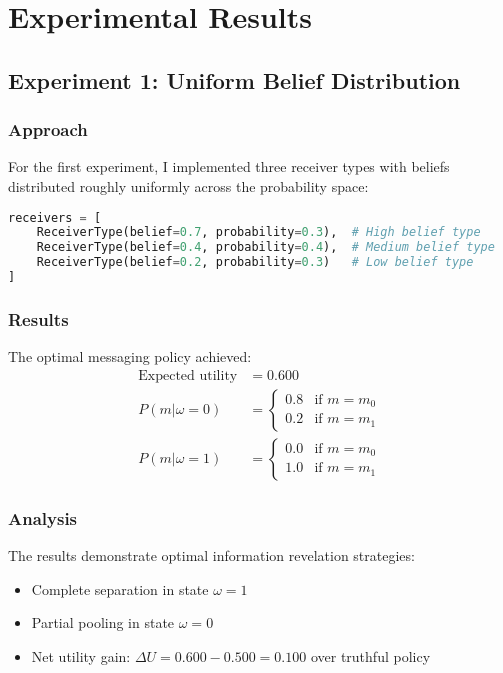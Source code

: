 \documentclass[12pt]{article}
\begin{document}
\section{Experimental Results}

\subsection{Experiment 1: Uniform Belief Distribution}

\subsubsection{Approach}
For the first experiment, I implemented three receiver types with beliefs distributed roughly uniformly across the probability space:

\begin{lstlisting}[language=Python, caption=Experiment 1 Setup]
receivers = [
    ReceiverType(belief=0.7, probability=0.3),  # High belief type
    ReceiverType(belief=0.4, probability=0.4),  # Medium belief type
    ReceiverType(belief=0.2, probability=0.3)   # Low belief type
]
\end{lstlisting}

\subsubsection{Results}
The optimal messaging policy achieved:
\begin{align*}
    \text{Expected utility} &= 0.600 \\
    P(m|\omega=0) &= \begin{cases}
        0.8 & \text{if } m = m_0 \\
        0.2 & \text{if } m = m_1
    \end{cases} \\
    P(m|\omega=1) &= \begin{cases}
        0.0 & \text{if } m = m_0 \\
        1.0 & \text{if } m = m_1
    \end{cases}
\end{align*}

\subsubsection{Analysis}
The results demonstrate optimal information revelation strategies:
\begin{itemize}
    \item Complete separation in state $\omega=1$
    \item Partial pooling in state $\omega=0$
    \item Net utility gain: $\Delta U = 0.600 - 0.500 = 0.100$ over truthful policy
\end{itemize}
\end{document}
